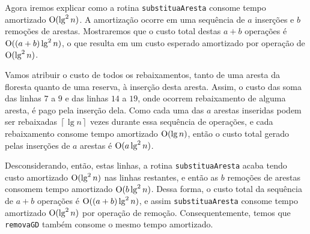 Agora iremos explicar como a rotina \texttt{substituaAresta} consome tempo amortizado $\mathrm{O}(\lg^2 n)$. A amortização ocorre em uma sequência de $a$ inserções e $b$ remoções de arestas. Mostraremos que o custo total destas $a + b$ operações é $\mathrm{O}((a + b) \lg^2 n)$, o que resulta em um custo esperado amortizado por operação de $\mathrm{O}(\lg^2 n)$. 

Vamos atribuir o custo de todos os rebaixamentos, tanto de uma aresta da floresta quanto de uma reserva, à inserção desta aresta. Assim, o custo das soma das linhas $7$ a $9$ e das linhas $14$ a $19$, onde ocorrem rebaixamento  de alguma aresta, é pago pela inserção dela. Como cada uma das $a$ arestas inseridas podem ser rebaixadas $\left\lceil \lg n \right\rceil$ vezes durante essa sequência de operações, e cada rebaixamento consome tempo amortizado $\mathrm{O}(\lg n)$, então o custo total gerado pelas inserções de $a$ arestas é $\mathrm{O}(a \lg^2 n)$. 

Desconsiderando, então, estas linhas, a rotina \texttt{substituaAresta} acaba tendo custo amortizado $\mathrm{O}(\lg^2 n)$ nas linhas restantes, e então as $b$ remoções de arestas consomem tempo amortizado $\mathrm{O}(b \lg^2 n)$. Dessa forma, o custo total da sequência de $a + b$ operações é $\mathrm{O}((a + b)\lg^2 n)$, e assim \texttt{substituaAresta} consome tempo amortizado $\mathrm{O}(\lg^2 n)$ por operação de remoção. Consequentemente, temos que \texttt{removaGD} também consome o mesmo tempo amortizado.